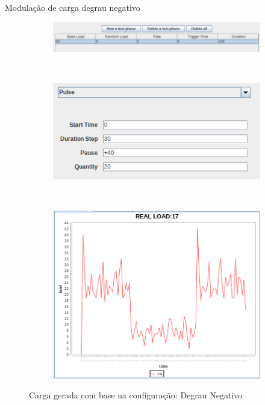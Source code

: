 \begin{frame}{Modulação de carga degrau negativo}
	\begin{figure}[!htb]
		\begin{subfigure}{\linewidth}
			\centering
			\includegraphics[scale=0.35]{../monograph/images/condiguracao-carga-bench4q2.png}
			\label{fig:condiguracao-carga-bench4q2}
		\end{subfigure}\\
		\begin{subfigure}{\linewidth}
			\centering
			\includegraphics[scale=0.35]{../monograph/images/condiguracao-carga-modulada2.png}
			\label{fig:condiguracao-carga-modulada2}
		\end{subfigure}\\[1ex]
		\begin{subfigure}{\linewidth}
			\centering
			\includegraphics[scale=0.3]{../monograph/images/grafico-carga-modulada2.png}
			\label{fig:grafico-carga-modulada2}
		\end{subfigure}
		\caption{Carga gerada com base na configuração: Degrau Negativo}
		\label{fig:carga-modulada2}
	\end{figure}
\end{frame}

